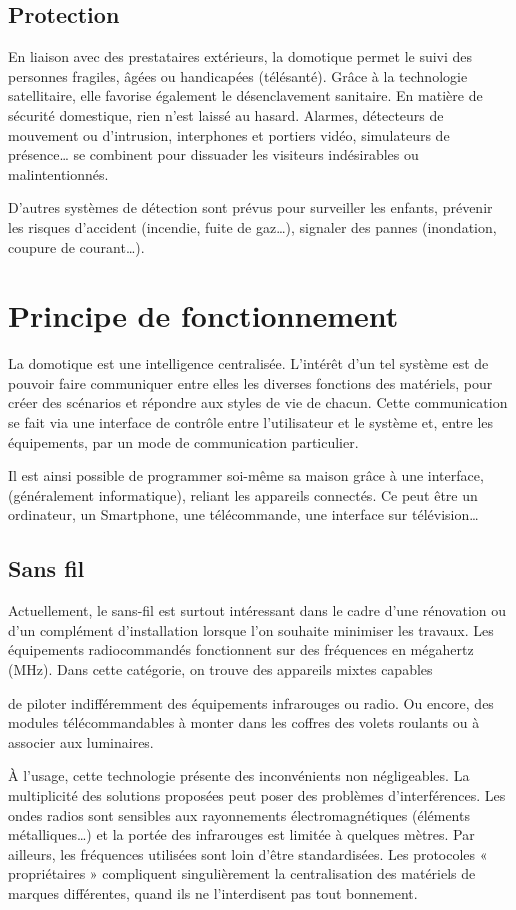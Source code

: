 \documentclass[12pt]{article}
\begin{document}
\subsection{Protection}
En liaison avec des prestataires extérieurs, la domotique permet le suivi des personnes fragiles, âgées ou handicapées (télésanté). Grâce à la technologie satellitaire, elle favorise également le désenclavement sanitaire. En matière de sécurité domestique, rien n’est laissé au hasard. Alarmes, détecteurs de mouvement ou d’intrusion, interphones et portiers vidéo, simulateurs de présence… se combinent pour dissuader les visiteurs indésirables ou malintentionnés.

D’autres systèmes de détection sont prévus pour surveiller les enfants, prévenir les risques d’accident (incendie, fuite de gaz…), signaler des pannes (inondation, coupure de courant…).

\section{Principe de fonctionnement}
La domotique est une intelligence centralisée. L'intérêt d'un tel système est de pouvoir faire communiquer entre elles les diverses fonctions des matériels, pour créer des scénarios et répondre aux styles de vie de chacun. Cette communication se fait via une interface de contrôle entre l'utilisateur et le système et, entre les équipements, par un mode de communication particulier.

Il est ainsi possible de programmer soi-même sa maison grâce à une interface, (généralement informatique), reliant les appareils connectés. Ce peut être un ordinateur, un Smartphone, une télécommande, une interface sur télévision…
\subsection{Sans fil}
Actuellement, le sans-fil est surtout intéressant dans le cadre d’une rénovation ou d’un complément d’installation lorsque l’on souhaite minimiser les travaux. Les équipements radiocommandés fonctionnent sur des fréquences en mégahertz (MHz). Dans cette catégorie, on trouve des appareils mixtes capables

de piloter indifféremment des équipements infrarouges ou radio. Ou encore, des modules télécommandables à monter dans les coffres des volets roulants ou à associer aux luminaires.

À l’usage, cette technologie présente des inconvénients non négligeables. La multiplicité des solutions proposées peut poser des problèmes d’interférences. Les ondes radios sont sensibles aux rayonnements électromagnétiques (éléments métalliques…) et la portée des infrarouges est limitée à quelques mètres. Par ailleurs, les fréquences utilisées sont loin d’être standardisées. Les protocoles « propriétaires » compliquent singulièrement la centralisation des matériels de marques différentes, quand ils ne l’interdisent pas tout bonnement.
\end{document}
